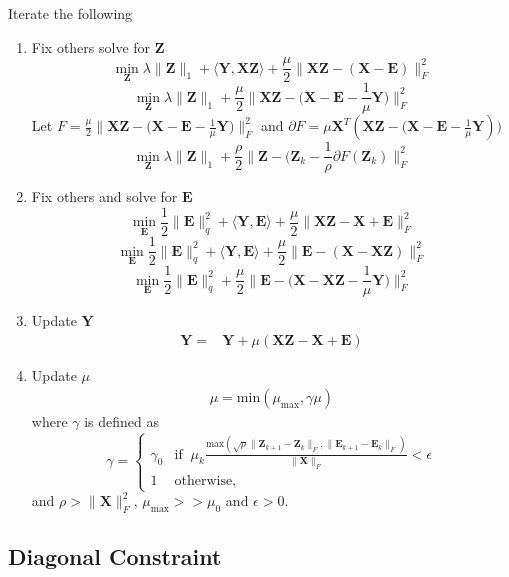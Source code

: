 \documentclass{article}
\begin{document}
Iterate the following
\begin{enumerate}
\item Fix others  solve for $\mathbf Z$
\[
\min_{\mathbf{Z}} \lambda\|\mathbf Z\|_{1} + \langle \mathbf{Y, XZ} \rangle + \frac{\mu}{2} \|\mathbf{XZ - (X - E) } \|_F^2 
\]
\[
\min_{\mathbf{Z}} \lambda\|\mathbf Z\|_{1} + \frac{\mu}{2} \|\mathbf{XZ - (X - E} - \frac{1}{\mu} \mathbf Y ) \|_F^2 
\]
Let $F = \frac{\mu}{2} \|\mathbf{XZ - (X - E} - \frac{1}{\mu} \mathbf Y ) \|_F^2$ and $\partial F =  \mu \mathbf X^T (\mathbf{XZ - (X - E} - \frac{1}{\mu} \mathbf Y ))$
\[
\min_{\mathbf{Z}} \lambda\|\mathbf Z\|_{1} + \frac{\rho}{2} \| \mathbf Z - (\mathbf Z_{k} - \frac{1}{\rho} \partial F(\mathbf Z_{k}) \|_F^2 
\]


\item Fix others and solve for $\mathbf E$
\[
\min_{\mathbf{E}} \frac12\|\mathbf E \|^2_q + \langle \mathbf{Y, E} \rangle + \frac{\mu}{2} \|\mathbf{XZ - X + E } \|_F^2 
\]
\[
\min_{\mathbf{E}} \frac12\|\mathbf E \|^2_q + \langle \mathbf{Y, E} \rangle + \frac{\mu}{2} \|\mathbf{E - (X - XZ)} \|_F^2 
\]
\[
\min_{\mathbf{E}} \frac12\|\mathbf E \|^2_q  + \frac{\mu}{2} \|\mathbf{E - (X - XZ} - \frac{1}{\mu} \mathbf Y) \|_F^2 
\]


\item Update $\mathbf Y$
\begin{align*}
\mathbf Y =& \mathbf Y + \mu (\mathbf{XZ - X + E})
\end{align*}

\item Update $\mu$
\begin{align*}
 \mu = \textrm{min}( \mu_{\text{max}}, \gamma \mu)
\end{align*}
where $\gamma$ is defined as
\[
\gamma = 
\begin{cases}
\gamma_0 & \text{if} \;\; \mu_k \frac{\textrm{max} (  \sqrt{\rho} \| \mathbf Z_{k+1} - \mathbf Z_{k}  \|_F  , \|  \mathbf E_{k+1} - \mathbf E_{k} \|_F)}{\| \mathbf X \|_F} < \epsilon \\
1 & \text{otherwise,}
\end{cases}
\]
and $\rho > \| \mathbf X \|_F^2$,  $\mu_{\text{max}} >>  \mu_0$ and $\epsilon > 0$.

\end{enumerate}

\subsection{Diagonal Constraint}
\end{document}

